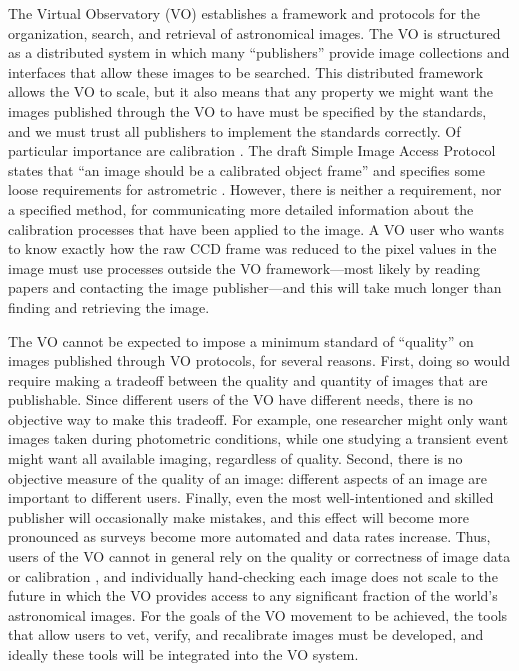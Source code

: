 The Virtual Observatory (VO) \cite{vo} establishes a framework and
protocols for the organization, search, and retrieval of astronomical
images.  The VO is structured as a distributed system in which many
``publishers'' provide image collections and interfaces that allow
these images to be searched.  This distributed framework allows the VO
to scale, but it also means that any property we might want the images
published through the VO to have must be specified by the standards,
and we must trust all publishers to implement the standards correctly.
Of particular importance are calibration \metadata
\cite{astrometryandvo}.  The draft Simple Image Access Protocol
\cite{siap} states that ``an image should be a calibrated object
frame'' and specifies some loose requirements for astrometric
\metadata.  However, there is neither a requirement, nor a specified
method, for communicating more detailed information about the
calibration processes that have been applied to the image.  A VO user
who wants to know exactly how the raw CCD frame was reduced to the
pixel values in the image must use processes outside the VO
framework---most likely by reading papers and contacting the image
publisher---and this will take much longer than finding and retrieving
the image.


The VO cannot be expected to impose a minimum standard of ``quality''
on images published through VO protocols, for several reasons.  First,
doing so would require making a tradeoff between the quality and
quantity of images that are publishable.  Since different users of the
VO have different needs, there is no objective way to make this
tradeoff.  For example, one researcher might only want images taken
during photometric conditions, while one studying a transient event
might want all available imaging, regardless of quality.  Second,
there is no objective measure of the quality of an image: different
aspects of an image are important to different users.  Finally, even
the most well-intentioned and skilled publisher will occasionally make
mistakes, and this effect will become more pronounced as surveys
become more automated and data rates increase.  Thus, users of the VO
cannot in general rely on the quality or correctness of image data or
calibration \metadata, and individually hand-checking each image does
not scale to the future in which the VO provides access to any
significant fraction of the world's astronomical images.  For the
goals of the VO movement to be achieved, the tools that allow users to
vet, verify, and recalibrate images must be developed, and ideally
these tools will be integrated into the VO system.


